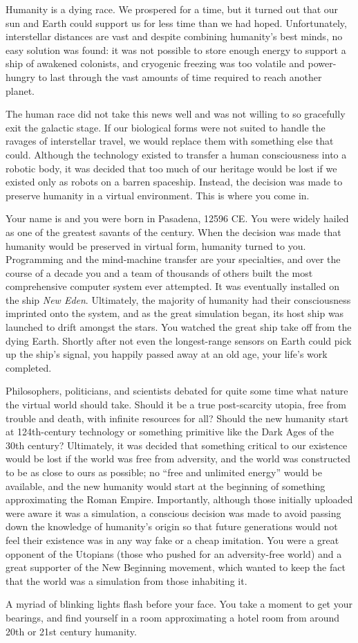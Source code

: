 \documentclass[char]{guildcamp1}
\begin{document}
\name{\cProgrammer{}}

Humanity is a dying race. We prospered for a time, but it turned out that our sun and Earth could support us for less time than we had hoped. Unfortunately, interstellar distances are vast and despite combining humanity's best minds, no easy solution was found: it was not possible to store enough energy to support a ship of awakened colonists, and cryogenic freezing was too volatile and power-hungry to last through the vast amounts of time required to reach another planet.

The human race did not take this news well and was not willing to so gracefully exit the galactic stage. If our biological forms were not suited to handle the ravages of interstellar travel, we would replace them with something else that could. Although the technology existed to transfer a human consciousness into a robotic body, it was decided that too much of our heritage would be lost if we existed only as robots on a barren spaceship. Instead, the decision was made to preserve humanity in a virtual environment. This is where you come in.

Your name is \cProgrammer{\they} and you were born in Pasadena, 12596 CE. You were widely hailed as one of the greatest savants of the century. When the decision was made that humanity would be preserved in virtual form, humanity turned to you. Programming and the mind-machine transfer are your specialties, and over the course of a decade you and a team of thousands of others built the most comprehensive computer system ever attempted. It was eventually installed on the ship \emph{New Eden}. Ultimately, the majority of humanity had their consciousness imprinted onto the system, and as the great simulation began, its host ship was launched to drift amongst the stars. You watched the great ship take off from the dying Earth. Shortly after not even the longest-range sensors on Earth could pick up the ship's signal, you happily passed away at an old age, your life's work completed.

Philosophers, politicians, and scientists debated for quite some time what nature the virtual world should take. Should it be a true post-scarcity utopia, free from trouble and death, with infinite resources for all? Should the new humanity start at 124th-century technology or something primitive like the Dark Ages of the 30th century? Ultimately,  it was decided that something critical to our existence would be lost if the world was free from adversity, and the world was constructed to be as close to ours as possible; no ``free and unlimited energy'' would be available, and the new humanity would start at the beginning of something approximating the Roman Empire. Importantly, although those initially uploaded were aware it was a simulation, a conscious decision was made to avoid passing down the knowledge of humanity's origin so that future generations would not feel their existence was in any way fake or a cheap imitation. You were a great opponent of the Utopians (those who pushed for an adversity-free world) and a great supporter of the New Beginning movement, which wanted to keep the fact that the world was a simulation from those inhabiting it.

A myriad of blinking lights flash before your face. You take a moment to get your bearings, and find yourself in a room approximating a hotel room from around 20th or 21st century humanity.
\end{document}

